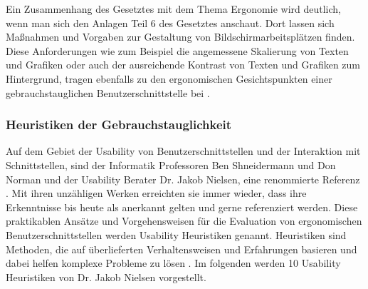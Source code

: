 Ein Zusammenhang des Gesetztes mit dem Thema Ergonomie wird deutlich, wenn man sich den Anlagen Teil 6 des Gesetztes anschaut. Dort lassen sich Maßnahmen und Vorgaben zur Gestaltung von Bildschirmarbeitsplätzen finden. Diese Anforderungen wie zum Beispiel die angemessene Skalierung von Texten und Grafiken oder auch der ausreichende Kontrast von Texten und Grafiken zum Hintergrund, tragen ebenfalls zu den ergonomischen Gesichtspunkten einer gebrauchstauglichen Benutzerschnittstelle bei \citep[vgl.][Anhang: Kap. 6]{ArbStaettV}.

\subsubsection{Heuristiken der Gebrauchstauglichkeit}
Auf dem Gebiet der Usability von Benutzerschnittstellen und der Interaktion mit Schnittstellen, sind der Informatik Professoren Ben Shneidermann und Don Norman und der Usability Berater Dr. Jakob Nielsen, eine renommierte Referenz \citep[vgl.][]{Wong2018}. Mit ihren unzähligen Werken erreichten sie immer wieder, dass ihre Erkenntnisse bis heute als anerkannt gelten und gerne referenziert werden. Diese praktikablen Ansätze und Vorgehensweisen für die Evaluation von ergonomischen Benutzerschnittstellen werden Usability Heuristiken genannt. Heuristiken sind Methoden, die auf überlieferten Verhaltensweisen und Erfahrungen basieren und dabei helfen komplexe Probleme zu lösen \citep[vgl.][]{Heuristik2018}. Im folgenden werden 10 Usability Heuristiken von Dr. Jakob Nielsen vorgestellt.
